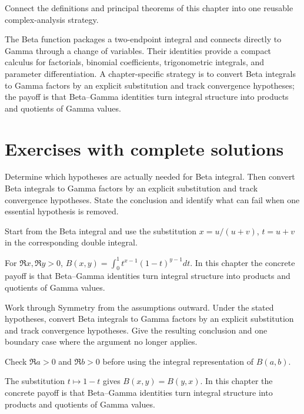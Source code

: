 \begin{problem}\label{prob:iv20-problem-12}
Connect the definitions and principal theorems of this chapter into one reusable complex-analysis strategy.
\end{problem}
\begin{solution}
The Beta function packages a two-endpoint integral and connects directly to Gamma through a change of variables. Their identities provide a compact calculus for factorials, binomial coefficients, trigonometric integrals, and parameter differentiation. A chapter-specific strategy is to convert Beta integrals to Gamma factors by an explicit substitution and track convergence hypotheses; the payoff is that Beta--Gamma identities turn integral structure into products and quotients of Gamma values.
\end{solution}

\section{Exercises with complete solutions}

\begin{exercise}\label{exr:iv20-01}
Determine which hypotheses are actually needed for Beta integral. Then convert Beta integrals to Gamma factors by an explicit substitution and track convergence hypotheses. State the conclusion and identify what can fail when one essential hypothesis is removed.
\end{exercise}
\begin{hint}
Start from the Beta integral and use the substitution \(x=u/(u+v)\), \(t=u+v\) in the corresponding double integral.
\end{hint}
\begin{solution}
For $\Re x,\Re y>0$, $B(x,y)=\int_0^1 t^{x-1}(1-t)^{y-1}dt$. In this chapter the concrete payoff is that Beta--Gamma identities turn integral structure into products and quotients of Gamma values.
\end{solution}

\begin{exercise}\label{exr:iv20-02}
Work through Symmetry from the assumptions outward. Under the stated hypotheses, convert Beta integrals to Gamma factors by an explicit substitution and track convergence hypotheses. Give the resulting conclusion and one boundary case where the argument no longer applies.
\end{exercise}
\begin{hint}
Check \(\Re a>0\) and \(\Re b>0\) before using the integral representation of \(B(a,b)\).
\end{hint}
\begin{solution}
The substitution $t\mapsto1-t$ gives $B(x,y)=B(y,x)$. In this chapter the concrete payoff is that Beta--Gamma identities turn integral structure into products and quotients of Gamma values.
\end{solution}

